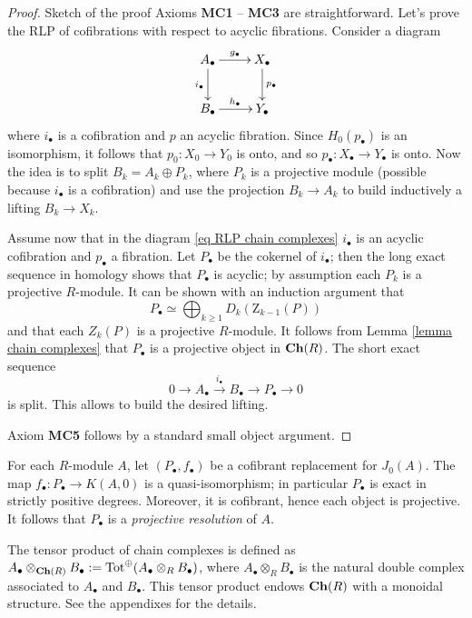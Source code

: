 \begin{proof}{Sketch of the proof}
Axioms {\bfseries MC1} -- {\bfseries MC3} are straightforward. Let's prove the RLP of cofibrations with respect to acyclic fibrations. Consider a diagram
\begin{equation} \label{eq RLP chain complexes}
\xymatrix{
A_\bullet \ar[r]^{g_\bullet} \ar[d]_{i_\bullet} & X_\bullet \ar[d]^{p_\bullet} \\ B_\bullet \ar[r]^{h_\bullet} & Y_\bullet
}
\end{equation}
where $i_\bullet$ is a cofibration and $p$ an acyclic fibration. Since $H_0(p_\bullet)$ is an isomorphism, it follows that $p_0 \colon X_0 \to Y_0$ is onto, and so $p_\bullet \colon X_\bullet \to Y_\bullet$ is onto. Now the idea is to split $B_k = A_k \oplus P_k$, where $P_k$ is a projective module (possible because $i_\bullet$ is a cofibration) and use the projection $B_k \to A_k$ to build inductively a lifting $B_k \to X_k$.

Assume now that in the diagram \eqref{eq RLP chain complexes} $i_\bullet$ is an acyclic cofibration and $p_\bullet$ a fibration. Let $P_\bullet$ be the cokernel of $i_\bullet$; then the long exact sequence in homology shows that $P_\bullet$ is acyclic; by assumption each $P_k$ is a projective $R$-module. It can be shown with an induction argument that
\[
P_\bullet \simeq \bigoplus_{k \ge 1} D_k(\mathrm{Z}_{k-1}(P))
\]
and that each $Z_k(P)$ is a projective $R$-module. It follows from Lemma \ref{lemma chain complexes} that $P_\bullet$ is a projective object in $\mathbf{Ch}(R)$. The short exact sequence
\[
0 \to A_\bullet \xrightarrow{i_\bullet} B_\bullet \to P_\bullet \to 0
\]
is split. This allows to build the desired lifting.

Axiom {\bfseries MC5} follows by a standard small object argument.
\end{proof}

\begin{eg}
For each $R$-module $A$, let $(P_\bullet,f_\bullet)$ be a cofibrant replacement for $J_0(A)$. The map $f_\bullet \colon P_\bullet \to K(A,0)$ is a quasi-isomorphism; in particular $P_\bullet$ is exact in strictly positive degrees. Moreover, it is cofibrant, hence each object is projective. It follows that $P_\bullet$ is a \emph{projective resolution} of $A$.
\end{eg}

\begin{rmk}
The tensor product of chain complexes is defined as $A_\bullet \otimes_{\mathbf{Ch}(R)} B_\bullet := \mathrm{Tot}^\oplus(A_\bullet \otimes_R B_\bullet)$, where $A_\bullet \otimes_R B_\bullet$ is the natural double complex associated to $A_\bullet$ and $B_\bullet$. This tensor product endows $\mathbf{Ch}(R)$ with a monoidal structure. See the appendixes for the details.
\end{rmk}

